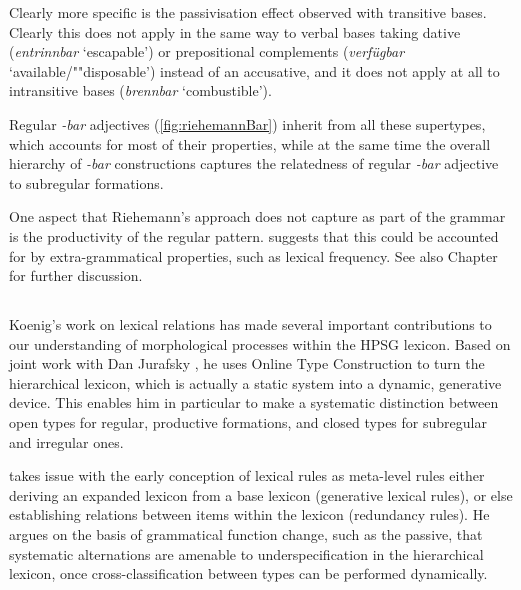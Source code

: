\documentclass[output=paper
	        ,collection
	        ,collectionchapter
 	        ,biblatex
                ,babelshorthands
                ,newtxmath
                ,draftmode
                ,colorlinks, citecolor=brown
]{langscibook}
\begin{document}
Clearly more specific is the passivisation effect observed with
transitive bases. Clearly this does not apply in the same way to
verbal bases taking dative (\textit{entrinnbar} `escapable') or
prepositional complements (\textit{verfügbar} `available/""disposable')
instead of an accusative, and it does not apply at all to intransitive
bases (\textit{brennbar} `combustible').  

\begin{exe}
  \ex
\end{exe}

Regular \textit{-bar} adjectives (\ref{fig:riehemannBar}) inherit from all these supertypes, which
accounts for most of their properties, while at the same time the overall hierarchy of \textit{-bar} constructions
captures the relatedness of regular \textit{-bar} adjective to subregular formations. 


One aspect that Riehemann's approach does not capture as part of the
grammar is the productivity of the regular
pattern. \citet{Riehemann98} suggests that this could be accounted for
by extra-grammatical properties, such as lexical frequency. See also
Chapter~ for further discussion.

\subsection{\citet{Koenig99}}

Koenig's work on lexical relations has made several important
contributions to our understanding of morphological processes within
the HPSG lexicon. Based on joint work with Dan Jurafsky
\citep{Koenig94}, he uses Online Type Construction to turn the
hierarchical lexicon, which is actually a static system into a
dynamic, generative device. This enables him in particular to make a
systematic distinction between open types for regular, productive
formations, and closed types for subregular and irregular ones.

\citet{Koenig99} takes issue with the early conception of lexical
rules as meta-level rules either deriving an expanded lexicon from a
base lexicon (generative lexical rules), or else establishing
relations between items within the lexicon (redundancy rules). He
argues on the basis of grammatical function change, such as the
 passive, that systematic alternations are amenable to
underspecification in the hierarchical lexicon,  once
cross-classification between types can be performed dynamically.
\end{document}
